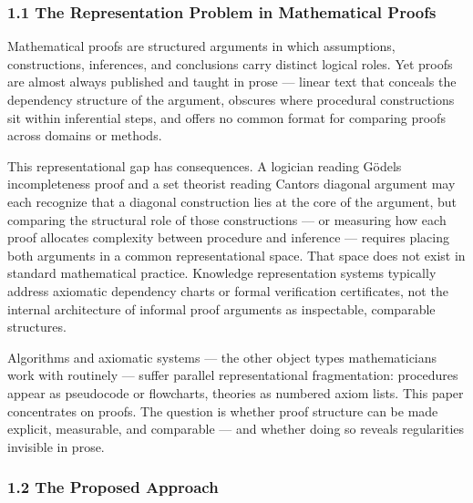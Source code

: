 \documentclass[
  11pt]{article}
\begin{document}
\hypertarget{11-the-representation-problem-in-mathematical-proofs}{%
\subsubsection{1.1 The Representation Problem in Mathematical
Proofs}\label{11-the-representation-problem-in-mathematical-proofs}}

Mathematical proofs are structured arguments in which assumptions,
constructions, inferences, and conclusions carry distinct logical roles.
Yet proofs are almost always published and taught in prose --- linear
text that conceals the dependency structure of the argument, obscures
where procedural constructions sit within inferential steps, and offers
no common format for comparing proofs across domains or methods.

This representational gap has consequences. A logician reading
Gödel\textquotesingle s incompleteness proof and a set theorist reading
Cantor\textquotesingle s diagonal argument may each recognize that a
diagonal construction lies at the core of the argument, but comparing
the structural role of those constructions --- or measuring how each
proof allocates complexity between procedure and inference --- requires
placing both arguments in a common representational space. That space
does not exist in standard mathematical practice. Knowledge
representation systems typically address axiomatic dependency charts or
formal verification certificates, not the internal architecture of
informal proof arguments as inspectable, comparable structures.

Algorithms and axiomatic systems --- the other object types
mathematicians work with routinely --- suffer parallel representational
fragmentation: procedures appear as pseudocode or flowcharts, theories
as numbered axiom lists. This paper concentrates on proofs. The question
is whether proof structure can be made explicit, measurable, and
comparable --- and whether doing so reveals regularities invisible in
prose.

\hypertarget{12-the-proposed-approach}{%
\subsubsection{1.2 The Proposed
Approach}\label{12-the-proposed-approach}}
\end{document}
